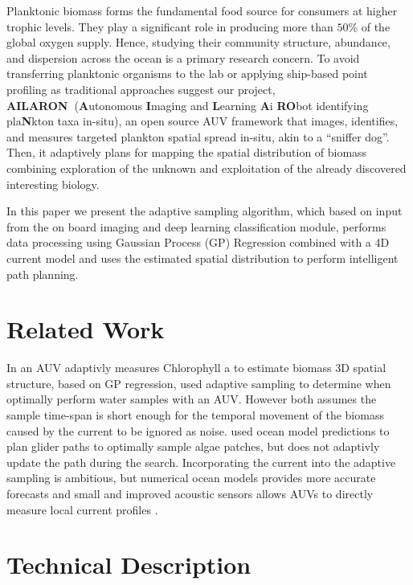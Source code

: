 \documentclass[conference]{IEEEtran}
\def\proj{{\textbf{AILARON\ }}}
\begin{document}
Planktonic biomass forms the fundamental food source for consumers at
higher trophic levels. They play a significant role in producing more
than $50\%$ of the global oxygen supply. Hence, studying their
community structure, abundance, and dispersion across the ocean is a
primary research concern. To avoid transferring planktonic organisms
to the lab or applying ship-based point profiling as traditional
approaches suggest our project, \proj (\textbf{A}utonomous
\textbf{I}maging and \textbf{L}earning \textbf{A}i \textbf{RO}bot
identifying pla\textbf{N}kton taxa in-situ), an open source AUV
framework that images, identifies, and measures targeted plankton
spatial spread in-situ, akin to a ``sniffer dog''.  Then, it
adaptively plans for mapping the spatial distribution of biomass
combining exploration of the unknown and exploitation of the already
discovered interesting biology.

In this paper we present the adaptive sampling algorithm, which based
on input from the on board imaging and deep learning classification
module, performs data processing using Gaussian Process (GP)
Regression combined with a 4D current model and uses the estimated
spatial distribution to perform intelligent path planning.


\section{Related Work}

In \cite{fossum18b} an AUV adaptivly measures Chlorophyll a to
estimate biomass 3D spatial structure, based on GP regression,
\cite{das15} used adaptive sampling to determine when optimally
perform water samples with an AUV.  However both assumes the sample
time-span is short enough for the temporal movement of the biomass
caused by the current to be ignored as noise.  \cite{smith10} used
ocean model predictions to plan glider paths to optimally sample algae
patches, but does not adaptivly update the path during the search.
Incorporating the current into the adaptive sampling is ambitious, but
numerical ocean models provides more accurate forecasts and small and
improved acoustic sensors allows AUVs to directly measure local
current profiles \cite{Fong2006, Cusi2017}.

\section{Technical Description}
\end{document}
